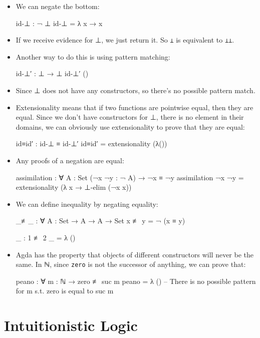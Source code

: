 \documentclass{lecturenotes}
\newcommand{\agdanats}{\textsf{ℕ}\xspace}
\newcommand{\agdaempty}{\textsf{⊥}\xspace}
\begin{document}
\begin{itemize}
\item We can negate the bottom:
\begin{code}
id-⊥ : ¬ ⊥ 
id-⊥ = λ {x → x}
\end{code}
\item If we receive evidence for \agdaempty, we just return it. 
      So \texttt{\lnot \agdaempty} is equivalent to \texttt{\agdaempty \rightarrow \agdaempty}.

\item Another way to do this is using pattern matching:
\begin{code}
id-⊥′ : ⊥ → ⊥
id-⊥′ ()
\end{code}
\item Since \agdaempty does not have any constructors, so there's no possible pattern match.

\item Extensionality means that if two functions are pointwise equal, then they are equal.
      Since we don't have constructors for \agdaempty, there is no element in their domains,
      we can obviously use extensionality to prove that they are equal:
\begin{code}
id≡id′ : id-⊥ ≡ id-⊥′
id≡id′ = extensionality (λ())
\end{code}

\item Any proofs of a negation are equal:
\begin{code}
assimilation : ∀ {A : Set} (¬x ¬y : ¬ A) → ¬x ≡ ¬y
assimilation ¬x ¬y = extensionality (λ x → ⊥-elim (¬x x))
\end{code}

\item We can define inequality by negating equality:
\begin{code}
_≢_ : ∀ {A : Set} → A → A → Set
x ≢ y = ¬ (x ≡ y)

_ : 1 ≢ 2
_ = λ ()
\end{code}
\item Agda has the property that objects of different constructors will never be the same.
      In \agdanats, since \texttt{zero} is not the successor of anything, we can prove that:

\begin{code}
peano : ∀ {m : ℕ} → zero ≢ suc m
peano = λ () -- There is no possible pattern for m s.t. zero is equal to suc m
\end{code}
\end{itemize} %

\section{Intuitionistic Logic}
\label{sec:intui-logic}
\end{document}
